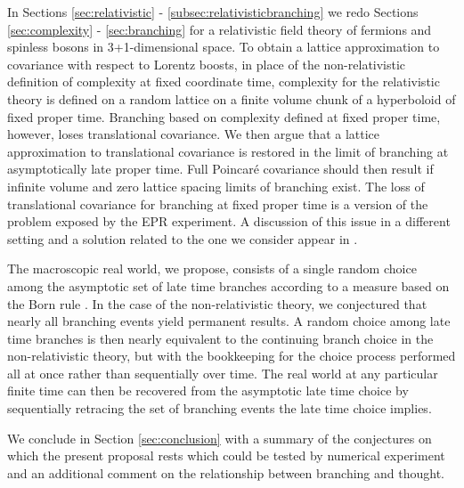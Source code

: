 \documentclass[12pt,amsmath,amssymb,onecolumn]{revtex4-2}
\begin{document}
In Sections \ref{sec:relativistic} - \ref{subsec:relativisticbranching}
we redo Sections \ref{sec:complexity} - \ref{sec:branching}
for a relativistic field theory of fermions and spinless bosons
in 3+1-dimensional space.
To obtain a lattice approximation to covariance with respect to Lorentz boosts,
in place of the non-relativistic definition 
of complexity at fixed coordinate time, complexity for the relativistic theory 
is defined on a random lattice on a finite volume chunk 
of a hyperboloid of fixed proper time. 
Branching based on complexity defined at fixed proper time, however,
loses translational covariance. We then argue that
a lattice approximation to translational covariance
is restored in the limit of branching at asymptotically late
proper time. Full Poincar\'{e} covariance should
then result if infinite volume and
zero lattice spacing limits of branching exist.
The loss of translational covariance for
branching at fixed proper time is a version of
the problem exposed by the EPR experiment.
A discussion of this issue in
a different setting and a solution related to
the one we consider appear in \cite{Kent, Kent1, Kent2}.

The macroscopic real world, we propose, consists of a single random choice
among the asymptotic set of late time branches according to a measure
based on the Born rule \cite{Weingarten1}.
In the case of the non-relativistic theory, we conjectured that
nearly all branching events yield permanent results.
A random choice among late time branches
is then nearly equivalent to the continuing branch choice in the non-relativistic
theory, but with the bookkeeping for the choice process performed all at once
rather than sequentially over time.
The real world at any particular finite time can then be recovered from the asymptotic late time choice
by sequentially retracing the set of branching
events the late time choice implies.


We conclude in Section \ref{sec:conclusion} with
a summary of the conjectures
on which the present proposal rests
which could be tested by numerical experiment
and an additional comment on the relationship between branching
and thought. 
\end{document}
